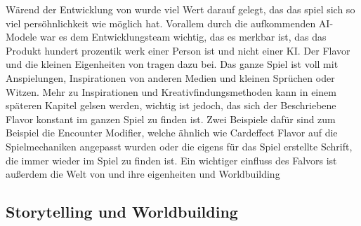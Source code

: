Wärend der Entwicklung von \FF wurde viel Wert darauf gelegt, das das spiel sich so viel persöhnlichkeit wie möglich hat.
Vorallem durch die aufkommenden AI-Modele war es dem Entwicklungsteam wichtig, das es merkbar ist,
das das Produkt hundert prozentik werk einer Person ist und nicht einer KI.
Der Flavor und die kleinen Eigenheiten von \FF tragen dazu bei.
Das ganze Spiel ist voll mit Anspielungen, Inspirationen von anderen Medien und kleinen Sprüchen oder Witzen. Mehr zu Inspirationen und Kreativfindungsmethoden
kann in einem späteren Kapitel gelsen werden, wichtig ist jedoch, das sich der Beschriebene Flavor konstant im ganzen Spiel zu finden ist.
Zwei Beispiele dafür sind zum Beispiel die Encounter Modifier, welche ähnlich wie Cardeffect Flavor auf die Spielmechaniken
angepasst wurden oder die eigens für das Spiel erstellte Schrift, die immer wieder im Spiel zu finden ist.
Ein wichtiger einfluss des Falvors ist außerdem die Welt von \FF und ihre eigenheiten und Worldbuilding



\subsection{Storytelling und Worldbuilding}\label{subsec:storytellingUndWorldbuilding}





\renewcommand{\kapitelautor}{}
